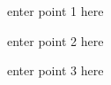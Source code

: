 \documentclass[draft]{agujournal2019}
\begin{document}













\begin{keypoints}
\item enter point 1 here
\item enter point 2 here
\item enter point 3 here
\end{keypoints}

%
%
\end{document}

